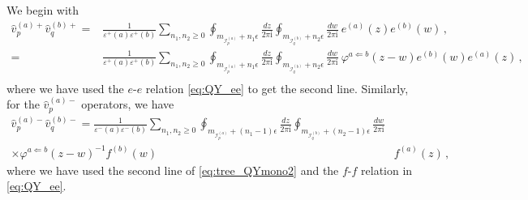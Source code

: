 \documentclass[12pt,a4paper]{article}
\renewcommand{\(}{\left(}
\renewcommand{\)}{\right)}
\renewcommand{\(}{\left(}
\renewcommand{\)}{\right)}
\begin{document}
We begin with 
\begin{equation}
\begin{aligned}
\hat{v}^{(a)+}_p\hat{v}^{(b)+}_q=&\frac{1}{\varepsilon^+(a)\varepsilon^+(b)}\sum_{n_1,n_2\geq 0} \oint_{m_{\mathcal{I}^{(a)}_{p}}+n_1\epsilon}\frac{dz}{2\pi \text{i}} \oint_{m_{\mathcal{I}^{(b)}_{q}}+n_2\epsilon}\frac{dw}{2\pi \text{i}}\ e^{(a)}(z)e^{(b)}(w)\,,\\
=&\frac{1}{\varepsilon^+(a)\varepsilon^+(b)}\sum_{n_1,n_2\geq 0} \oint_{m_{\mathcal{I}^{(a)}_{p}}+n_1\epsilon}\frac{dz}{2\pi \text{i}} \oint_{m_{\mathcal{I}^{(b)}_{q}}+n_2\epsilon}\frac{dw}{2\pi \text{i}}\ \varphi^{a\Leftarrow b}(z-w) e^{(b)}(w)e^{(a)}(z)\,,\\
\end{aligned}
\end{equation}
where we have used the $e$-$e$ relation \eqref{eq:QY_ee} to get the second line. 
Similarly, for the $\hat{v}^{(a)-}_p$ operators, we have
\begin{equation}
\begin{aligned}
\hat{v}^{(a)-}_p\hat{v}^{(b)-}_q =\frac{1}{\varepsilon^-(a)\varepsilon^-(b)}\sum_{n_1,n_2\geq 0} \oint_{m_{\mathcal{I}^{(a)}_{p}}+(n_1-1)\epsilon}\frac{dz}{2\pi \text{i}} \oint_{m_{\mathcal{I}^{(b)}_{q}}+(n_2-1)\epsilon}\frac{dw}{2\pi \text{i}}&\\
\times \varphi^{a\Leftarrow b}(z-w)^{-1} f^{(b)}(w)&f^{(a)}(z)\,,
\end{aligned}
\end{equation}
where we have used the second line of \eqref{eq:tree_QYmono2} and the $f$-$f$ relation in \eqref{eq:QY_ee}.

\medskip
\end{document}
